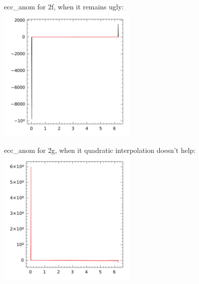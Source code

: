 \documentclass[11pt]{article}
\begin{document}
ecc\_anom for 2f, when it remains ugly:\\
\includegraphics[width=0.5\textwidth]{2f_ecc_anom_stillpoor.pdf}

ecc\_anom for 2g, when it quadratic interpolation doesn't help:\\
\includegraphics[width=0.5\textwidth]{2g_ecc_anom_stillpoor_quadratic.pdf}
\end{document}
